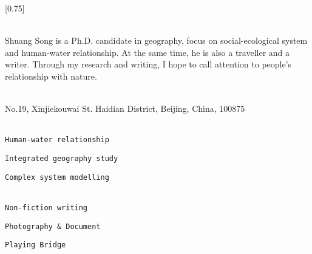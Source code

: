 \documentclass[lighthipster]{simplehipstercv}
\begin{document}
\setlength{\columnsep}{1.5cm}
[0.75]
\begin{paracol}{2}

\paracolbackgroundoptions



\footnotesize
{\setasidefontcolour
\flushright
\begin{center}
\end{center}

\\[0.5em]

Shuang Song is a Ph.D. candidate in geography, focus on social-ecological system and human-water relationship. At the same time, he is also a traveller and a writer. Through my research and writing, I hope to call attention to people's relationship with nature. 
\bigskip

 \\[0.5em]
No.19, Xinjiekouwai St. Haidian District, Beijing, China, 100875

\bigskip







\\[0.5em]

\texttt{Human-water relationship}

\texttt{Integrated geography study}

\texttt{Complex system modelling}

\bigskip
{}\\[0.5em]

\texttt{Non-fiction writing}

\texttt{Photography \& Document}

\texttt{Playing Bridge} 

\vspace{4em}

}
\end{paracol}
\end{document}
